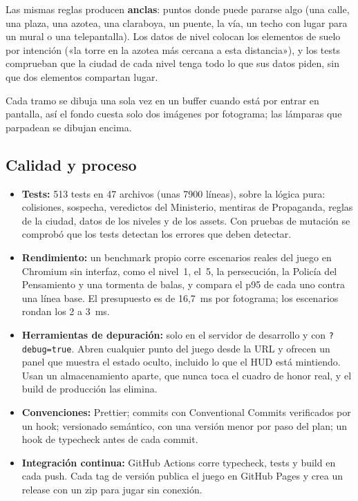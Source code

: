 \documentclass[11pt,a4paper]{article}
\begin{document}
Las mismas reglas producen \textbf{anclas}: puntos donde puede pararse algo (una calle, una plaza, una azotea, una claraboya, un puente, la vía, un techo con lugar para un mural o una telepantalla). Los datos de nivel colocan los elementos de suelo por intención («la torre en la azotea más cercana a esta distancia»), y los tests comprueban que la ciudad de cada nivel tenga todo lo que sus datos piden, sin que dos elementos compartan lugar.

Cada tramo se dibuja una sola vez en un buffer cuando está por entrar en pantalla, así el fondo cuesta solo dos imágenes por fotograma; las lámparas que parpadean se dibujan encima.

\subsection{Calidad y proceso}

\begin{itemize}
  \item \textbf{Tests:} 513 tests en 47 archivos (unas 7900 líneas), sobre la lógica pura: colisiones, sospecha, veredictos del Ministerio, mentiras de Propaganda, reglas de la ciudad, datos de los niveles y de los assets. Con pruebas de mutación se comprobó que los tests detectan los errores que deben detectar.
  \item \textbf{Rendimiento:} un benchmark propio corre escenarios reales del juego en Chromium sin interfaz, como el nivel~1, el~5, la persecución, la Policía del Pensamiento y una tormenta de balas, y compara el p95 de cada uno contra una línea base. El presupuesto es de 16,7~ms por fotograma; los escenarios rondan los 2 a 3~ms.
  \item \textbf{Herramientas de depuración:} solo en el servidor de desarrollo y con \texttt{?debug=true}. Abren cualquier punto del juego desde la URL y ofrecen un panel que muestra el estado oculto, incluido lo que el HUD está mintiendo. Usan un almacenamiento aparte, que nunca toca el cuadro de honor real, y el build de producción las elimina.
  \item \textbf{Convenciones:} Prettier; commits con Conventional Commits verificados por un hook; versionado semántico, con una versión menor por paso del plan; un hook de typecheck antes de cada commit.
  \item \textbf{Integración continua:} GitHub Actions corre typecheck, tests y build en cada push. Cada tag de versión publica el juego en GitHub Pages y crea un release con un zip para jugar sin conexión.
\end{itemize}
\end{document}
